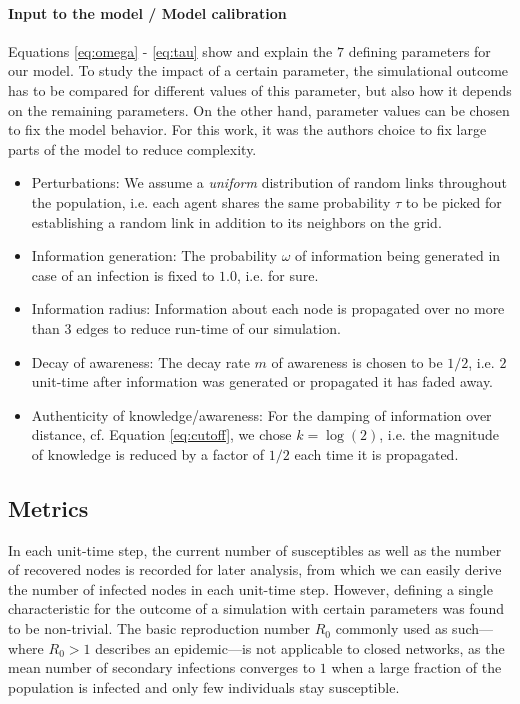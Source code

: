 \documentclass[11pt]{article}
\begin{document}
\paragraph*{Input to the model / Model calibration} Equations \ref{eq:omega} - \ref{eq:tau} show and explain the $7$ defining parameters for our model. To study the impact of a certain parameter, the simulational outcome has to be compared for different values of this parameter, but also how it depends on the remaining parameters. On the other hand, parameter values can be chosen to fix the model behavior. For this work, it was the authors choice to fix large parts of the model to reduce complexity.\\
\begin{itemize}
 \item Perturbations: We assume a {\it uniform} distribution of random links throughout the population, i.e. each agent shares the same probability $\tau$ to be picked for establishing a random link in addition to its neighbors on the grid.
  \item Information generation: The probability $\omega$ of information being generated in case of an infection is fixed to $1.0$, i.e. for sure.
  \item Information radius: Information about each node is propagated over no more than $3$ edges to reduce run-time of our simulation.
  \item Decay of awareness: The decay rate $m$ of awareness is chosen to be $1/2$, i.e. $2$ unit-time after information was generated or propagated it has faded away.
  \item Authenticity of knowledge/awareness: For the damping of information over distance, cf. Equation \ref{eq:cutoff}, we chose $k = \log(2)$, i.e. the magnitude of knowledge is reduced by a factor of $1/2$ each time it is propagated.
\end{itemize}


\subsection{Metrics}
In each unit-time step, the current number of susceptibles as well as the number of recovered nodes is recorded for later analysis, from which we can easily derive the number of infected nodes in each unit-time step.
However, defining a single characteristic for the outcome of a simulation with certain parameters was found to be non-trivial.
The basic reproduction number $R_{0}$ commonly used as such---where $R_{0} > 1$ describes an epidemic---is not applicable to closed networks, as the mean number of secondary infections converges to $1$ when a large fraction of the population is infected and only few individuals stay susceptible.
\end{document}
